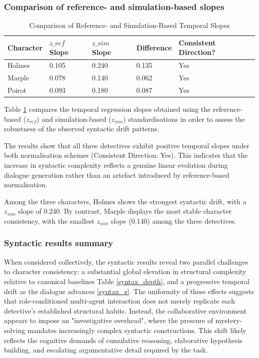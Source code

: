 \documentclass{article}
\begin{document}
\subsubsection{Comparison of reference- and simulation-based slopes}

\begin{table}[H]
\centering
\begin{tabular}{l l l l l}\toprule
Character & $z\_{ref}$ Slope& $z\_{sim}$ Slope & Difference & Consistent Direction? \\\midrule
Holmes & 0.105 & 0.240 & 0.135 & Yes \\
Marple & 0.078 & 0.140 & 0.062 & Yes \\
Poirot & 0.093 & 0.180 & 0.087 & Yes \\ \bottomrule
\end{tabular}
\caption{Comparison of Reference- and Simulation-Based Temporal Slopes}
\label{syntax_slope_compare}
\end{table}

Table \ref{syntax_slope_compare} compares the temporal regression slopes obtained using the reference-based ($z_{ref}$) and simulation-based ($z_{sim}$) standardisations in order to assess the robustness of the observed syntactic drift patterns.

The results show that all three detectives exhibit positive temporal slopes under both normalisation schemes (Consistent Direction: Yes). This indicates that the increase in syntactic complexity reflects a genuine linear evolution during dialogue generation rather than an artefact introduced by reference-based normalisation.

Among the three characters, Holmes shows the strongest syntactic drift, with a $z_{sim}$ slope of 0.240. By contrast, Marple displays the most stable character consistency, with the smallest $z_{sim}$ slope (0.140) among the three detectives.

\subsubsection{Syntactic results summary}

When considered collectively, the syntactic results reveal two parallel challenges to character consistency: a substantial global elevation in structural complexity relative to canonical baselines Table \ref{syntax_depth}, and a progressive temporal drift as the dialogue advances \ref{syntax_z}.
The uniformity of these effects suggests that role-conditioned multi-agent interaction does not merely replicate each detective’s established structural habits. Instead, the collaborative environment appears to impose an "investigative overhead", where the pressure of mystery-solving mandates increasingly complex syntactic constructions. This shift likely reflects the cognitive demands of cumulative reasoning, elaborative hypothesis building, and escalating argumentative detail required by the task.
\end{document}
